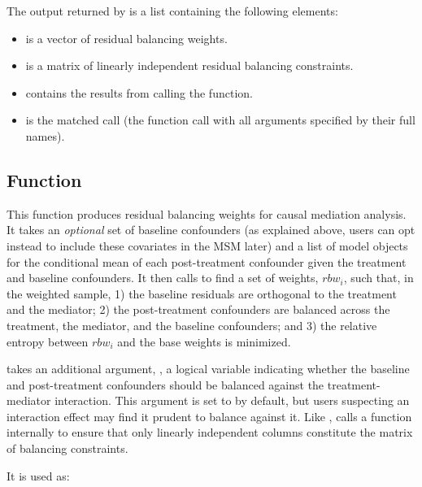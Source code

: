 The output returned by  is a list containing the
following elements:

\begin{itemize}
\tightlist
\item
   is a vector of residual balancing weights.
\item
   is a matrix of linearly independent residual
  balancing constraints.
\item
   contains the results from calling the 
  function.
\item
   is the matched call (the function call with all arguments
  specified by their full names).
\end{itemize}

\hypertarget{rbwMed}{%
\subsection{\texorpdfstring{Function
}{Function }}\label{rbwMed}}

This function produces residual balancing weights for causal mediation
analysis. It takes an \emph{optional} set of baseline confounders (as
explained above, users can opt instead to include these covariates in
the MSM later) and a list of model objects for the conditional mean of
each post-treatment confounder given the treatment and baseline
confounders. It then calls  to find a set of weights,
\(rbw_{i}\), such that, in the weighted sample, 1) the baseline
residuals are orthogonal to the treatment and the mediator; 2) the
post-treatment confounders are balanced across the treatment, the
mediator, and the baseline confounders; and 3) the relative entropy
between \(rbw_{i}\) and the base weights is minimized.

 takes an additional argument, , a logical
variable indicating whether the baseline and post-treatment confounders
should be balanced against the treatment-mediator interaction. This
argument is set to  by default, but users suspecting an
interaction effect may find it prudent to balance against it. Like
,  calls a function internally to ensure
that only linearly independent columns constitute the matrix of
balancing constraints.

It is used as:

\\
\hspace*{0.333em}\hspace*{0.333em}\hspace*{0.333em}\hspace*{0.333em}\hspace*{0.333em}\hspace*{0.333em}\hspace*{0.333em}\hspace*{0.333em}\hspace*{0.333em}\hspace*{0.333em}\hspace*{0.333em}


